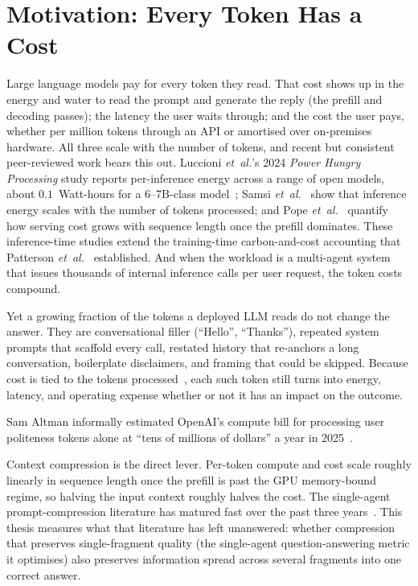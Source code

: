 \section{Motivation: Every Token Has a Cost}
\label{sec:motivation}

Large language models pay for every token they read. That cost shows up
in the energy and water to read the prompt and generate
the reply (the prefill and decoding passes); the latency the user waits
through; and the cost the user pays, whether per million tokens
through an API or amortised over on-premises hardware. All three scale
with the number of tokens, and recent but consistent peer-reviewed work
bears this out. Luccioni \emph{et~al.}'s 2024 \emph{Power Hungry
Processing} study reports per-inference energy across a range of open
models, about $0.1$~Watt-hours for a 6--7B-class
model~\cite{luccioni2024powerhungry}; Samsi
\emph{et~al.}~\cite{samsi2023words} show that inference energy scales
with the number of tokens processed; and Pope
\emph{et~al.}~\cite{pope2023efficiently} quantify how serving cost grows
with sequence length once the prefill dominates. These inference-time
studies extend the training-time carbon-and-cost accounting that
Patterson \emph{et~al.}~\cite{patterson2021carbon} established. And when
the workload is a multi-agent system that issues thousands of
internal inference calls per user request, the token costs
compound.

Yet a growing fraction of the tokens a deployed LLM reads do not change
the answer. They are conversational filler (``Hello'', ``Thanks''),
repeated system prompts that scaffold every call, restated history that
re-anchors a long conversation, boilerplate disclaimers, and framing that could be skipped. Because cost is tied to the tokens
processed~\cite{luccioni2024powerhungry, samsi2023words,
pope2023efficiently}, each such token still turns into energy, latency,
and operating expense whether or not it has an impact on the outcome.

Sam Altman informally estimated OpenAI's compute bill for processing
user politeness tokens alone at ``tens of millions of dollars'' a
year in 2025~\cite{altman2025pleasethankyou}.

Context compression is the direct lever. Per-token compute and cost
scale roughly linearly in sequence length once the prefill is past
the GPU memory-bound regime, so halving the input context roughly
halves the cost. The single-agent prompt-compression literature has
matured fast over the past three
years~\cite{jiang2023llmlingua, jiang2024longllmlingua, pan2024llmlingua2,
mu2023gist, chevalier2023autocompressor, ge2024icae}. This thesis
measures what that literature has left unanswered: whether compression
that preserves single-fragment quality (the single-agent
question-answering metric it optimises) also preserves information spread across several fragments into one correct answer.

